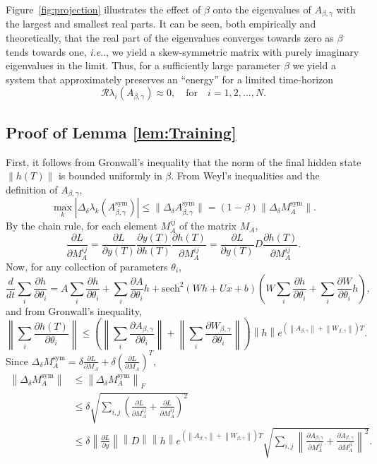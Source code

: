 \documentclass{article} \usepackage{iclr2021_conference,times}
\makeatletter
\newcommand{\sym}{\mathrm{sym}}
\DeclareRobustCommand\onedot{\futurelet\@let@token\@onedot}
\def\@onedot{\ifx\@let@token.\else.\null\fi\xspace}
\def\ie{\emph{i.e}\onedot} \def\Ie{\emph{I.e}\onedot}
\makeatother
\begin{document}
Figure~\ref{fig:projection} illustrates the effect of $\beta$ onto the eigenvalues of $A_{\beta,\gamma}$ with the largest and smallest real parts. 
It can  be seen, both empirically and theoretically, that the real part of the eigenvalues converges towards zero as $\beta$ tends towards one, \ie, we yield a skew-symmetric matrix with purely imaginary eigenvalues in the limit.
Thus, for a sufficiently large parameter $\beta$ we yield a system that approximately preserves an ``energy'' for a limited time-horizon 
\begin{equation}
\mathcal{R}\lambda_i(A_{\beta,\gamma}) \approx 0, \quad \text{for} \quad i=1,2,\dots,N.
\end{equation}


\subsection{Proof of Lemma \ref{lem:Training}}
First, it follows from Gronwall's inequality that the norm of the final hidden state $\|h(T)\|$ is bounded uniformly in $\beta$. From Weyl's inequalities and the definition of $A_{\beta,\gamma}$,
\[
\max_k |\Delta_\delta \lambda_k(A_{\beta,\gamma}^\sym)| \leq \| \Delta_{\delta}A_{\beta,\gamma}^{\sym}\| =(1-\beta)\| \Delta_{\delta}M_{A}^{\sym}\|.
\]
By the chain rule, for each element $M_A^{ij}$ of the matrix $M_A$,
\[
\frac{\partial L}{\partial M_{A}^{ij}}=\frac{\partial L}{\partial y(T)}\frac{\partial y(T)}{\partial h(T)}\frac{\partial h(T)}{\partial M_{A}^{ij}}=\frac{\partial L}{\partial y(T)}D\frac{\partial h(T)}{\partial M_{A}^{ij}}.
\]
Now, for any collection of parameters $\theta_i$,
\[
\frac{d}{dt}\sum_{i}\frac{\partial h}{\partial\theta_{i}}=A\sum_{i}\frac{\partial h}{\partial\theta_{i}}+\sum_{i}\frac{\partial A}{\partial\theta_{i}}h+\mathrm{sech}^2\left(Wh+Ux+b\right)\left(W\sum_{i}\frac{\partial h}{\partial\theta_{i}}+\sum_{i}\frac{\partial W}{\partial\theta_{i}}h\right),
\]
and from Gronwall's inequality,
\[
\left\lVert \sum_{i}\frac{\partial h(T)}{\partial\theta_{i}}\right\rVert \leq\left(\left\lVert \sum_{i}\frac{\partial A_{\beta,\gamma}}{\partial\theta_{i}}\right\rVert +\left\lVert \sum_{i}\frac{\partial W_{\beta,\gamma}}{\partial\theta_{i}}\right\rVert \right)\left\lVert h\right\rVert e^{(\left\lVert A_{\beta,\gamma}\right\rVert +\left\lVert W_{\beta,\gamma}\right\rVert )T}.
\]
Since $\Delta_{\delta}M_{A}^{\sym}=\delta\frac{\partial L}{\partial M_{A}}+\delta\left(\frac{\partial L}{\partial M_{A}}\right)^{T}$,
\begin{align*}
\left\lVert \Delta_{\delta}M_{A}^{\sym}\right\rVert &\leq\left\lVert \Delta_{\delta}M_{A}^{\sym}\right\rVert _{F}\\
&\leq\delta\sqrt{\sum_{i,j}\left(\frac{\partial L}{\partial M_{A}^{ij}}+\frac{\partial L}{\partial M_{A}^{ij}}\right)^{2}}\\
&\leq\delta\left\lVert \frac{\partial L}{\partial y}\right\rVert \left\lVert D\right\rVert \left\lVert h\right\rVert e^{(\left\lVert A_{\beta,\gamma}\right\rVert +\left\lVert W_{\beta,\gamma}\right\rVert )T}\sqrt{\sum_{i,j}\left\lVert \frac{\partial A_{\beta,\gamma}}{\partial M_{A}^{ij}}+\frac{\partial A_{\beta,\gamma}}{\partial M_{A}^{ji}}\right\rVert ^{2}}.
\end{align*}
\end{document}

